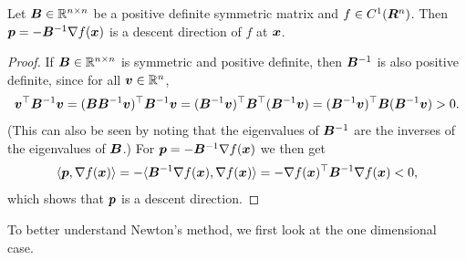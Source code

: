 \begin{lemma}
Let $\bm{B}\in \mathbb{R}^{n\times n}$ be a positive definite symmetric matrix and $f\in C^1(\bm{R}^n)$.
Then $\bm{p}=-\bm{B}^{-1}\nabla f(\bm{x})$ is a descent direction of $f$ at $\bm{x}$.
\end{lemma}

\begin{proof}
 If $\bm{B}\in \mathbb{R}^{n\times n}$ is symmetric and positive definite, then $\bm{B}^{-1}$ is also positive definite, since for all $\bm{v}\in \mathbb{R}^n$, 
 \begin{equation*}
  \bm{v}^{\top}\bm{B}^{-1}\bm{v}= (\bm{B}\bm{B}^{-1}\bm{v})^{\top}\bm{B}^{-1}\bm{v}
  = 
  (\bm{B}^{-1}\bm{v})^{\top}\bm{B}^{\top} (\bm{B}^{-1}\bm{v}) = (\bm{B}^{-1}\bm{v})^{\top}\bm{B} (\bm{B}^{-1}\bm{v})>0.
 \end{equation*}
(This can also be seen by noting that the eigenvalues of $\bm{B}^{-1}$ are the inverses of the eigenvalues of $\bm{B}$.)
 For $\bm{p}=-\bm{B}^{-1}\nabla f(\bm{x})$ we then get
 \begin{equation*}
  \langle {\bm{p}}, {\nabla f(\bm{x})} \rangle = -\langle {\bm{B}^{-1}\nabla f(\bm{x})}, {\nabla f(\bm{x})} \rangle =-\nabla f(\bm{x})^{\top}\bm{B}^{-1}\nabla f(\bm{x})<0,
 \end{equation*}
which shows that $\bm{p}$ is a descent direction. 
\end{proof}

To better understand Newton's method, we first look at the one dimensional case. 

